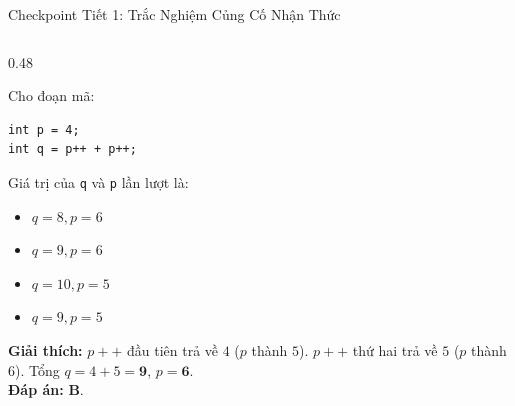 \documentclass[aspectratio=169, 10pt]{beamer}
\begin{document}
\begin{frame}[fragile]{Checkpoint Tiết 1: Trắc Nghiệm Củng Cố Nhận Thức}
\begin{columns}[T]
    \begin{column}{0.48\textwidth}
      \begin{tcolorbox}[colback=UniNavy!5,colframe=UniNavy,title=\textbf{Câu hỏi 3: Tiền tố vs Hậu tố},fonttitle=\small\bfseries]
        Cho đoạn mã:
\begin{lstlisting}[numbers=none]
int p = 4;
int q = p++ + p++;
\end{lstlisting}
        Giá trị của \texttt{q} và \texttt{p} lần lượt là:
        \begin{itemize}\footnotesize
          \item[A.] $q = 8, p = 6$
          \item[B.] $q = 9, p = 6$
          \item[C.] $q = 10, p = 5$
          \item[D.] $q = 9, p = 5$
        \end{itemize}
        \textbf{Giải thích:} $p++$ đầu tiên trả về $4$ ($p$ thành $5$). $p++$ thứ hai trả về $5$ ($p$ thành $6$). Tổng $q = 4 + 5 = \mathbf{9}$, $p = \mathbf{6}$.\\
        \textbf{Đáp án:} \textcolor{UniGreen}{\textbf{B}}.
      \end{tcolorbox}
    \end{column}
  \end{columns}
\end{frame}
\end{document}
